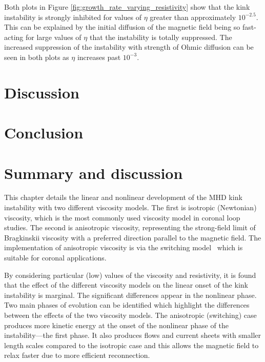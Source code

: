 Both plots in Figure \ref{fig:growth_rate_varying_resistivity} show that the kink instability is strongly inhibited for values of $\eta$ greater than approximately $10^{-2.5}$. This can be explained by the initial diffusion of the magnetic field being so fast-acting for large values of $\eta$ that the instability is totally suppressed. The increased suppression of the instability with strength of Ohmic diffusion can be seen in both plots as $\eta$ increases past $10^{-3}$.

\section{Discussion}


\section{Conclusion}

\section{Summary and discussion}
\label{sec:conclusions}

This chapter details the linear and nonlinear development of the MHD kink
instability with two different viscosity models. The first is
isotropic (Newtonian) viscosity, which is the most commonly used
viscosity model in coronal loop studies. The second is anisotropic viscosity, representing the strong-field limit of Bragkinskii viscosity with a preferred direction parallel to the magnetic field. The implementation of anisotropic viscosity is via the switching model~\cite{mactaggartBraginskiiMagnetohydrodynamicsArbitrary2017} which is suitable for coronal applications.

By considering particular (low) values of the viscosity and resistivity, it is found that the effect of the different viscosity models on the linear onset of the kink instability is marginal. The significant differences appear in the nonlinear phase. Two main phases of evolution can be identified which highlight the differences between the effects of the two viscosity models. The anisotropic (switching) case produces more kinetic energy at the onset of the nonlinear phase of the instability---the first phase. It also produces flows and current sheets with smaller length scales compared to the isotropic case and this allows the magnetic field to relax faster due to more efficient reconnection. 

